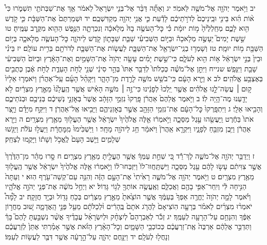 \documentclass[twoside, openany, parskip=half, 11pt]{book}
\begin{document}
יב וַיֹּ֥אמֶר יְהֹוָ֖ה אֶל־מֹשֶׁ֥ה לֵּאמֹֽר׃ יג וְאַתָּ֞ה דַּבֵּ֨ר אֶל־בְּנֵ֤י יִשְׂרָאֵל֙ לֵאמֹ֔ר אַ֥ךְ אֶת־שַׁבְּתֹתַ֖י תִּשְׁמֹ֑רוּ כִּי֩ א֨וֹת הִ֜וא בֵּינִ֤י וּבֵֽינֵיכֶם֙ לְדֹרֹ֣תֵיכֶ֔ם לָדַ֕עַת כִּ֛י אֲנִ֥י יְהֹוָ֖ה מְקַדִּשְׁכֶֽם׃ יד וּשְׁמַרְתֶּם֙ אֶת־הַשַּׁבָּ֔ת כִּ֛י קֹ֥דֶשׁ הִ֖וא לָכֶ֑ם מְחַֽלְלֶ֙יהָ֙ מ֣וֹת יוּמָ֔ת כִּ֗י כׇּל־הָעֹשֶׂ֥ה בָהּ֙ מְלָאכָ֔ה וְנִכְרְתָ֛ה הַנֶּ֥פֶשׁ הַהִ֖וא מִקֶּ֥רֶב עַמֶּֽיהָ׃ טו שֵׁ֣שֶׁת יָמִים֮ יֵעָשֶׂ֣ה מְלָאכָה֒ וּבַיּ֣וֹם הַשְּׁבִיעִ֗י שַׁבַּ֧ת שַׁבָּת֛וֹן קֹ֖דֶשׁ לַיהֹוָ֑ה כׇּל־הָעֹשֶׂ֧ה מְלָאכָ֛ה בְּי֥וֹם הַשַּׁבָּ֖ת מ֥וֹת יוּמָֽת׃ טז וְשָׁמְר֥וּ בְנֵֽי־יִשְׂרָאֵ֖ל אֶת־הַשַּׁבָּ֑ת לַעֲשׂ֧וֹת אֶת־הַשַּׁבָּ֛ת לְדֹרֹתָ֖ם בְּרִ֥ית עוֹלָֽם׃ יז בֵּינִ֗י וּבֵין֙ בְּנֵ֣י יִשְׂרָאֵ֔ל א֥וֹת הִ֖וא לְעֹלָ֑ם כִּי־שֵׁ֣שֶׁת יָמִ֗ים עָשָׂ֤ה יְהֹוָה֙ אֶת־הַשָּׁמַ֣יִם וְאֶת־הָאָ֔רֶץ וּבַיּוֹם֙ הַשְּׁבִיעִ֔י שָׁבַ֖ת וַיִּנָּפַֽשׁ׃
שנייח וַיִּתֵּ֣ן אֶל־מֹשֶׁ֗ה כְּכַלֹּתוֹ֙ לְדַבֵּ֤ר אִתּוֹ֙ בְּהַ֣ר סִינַ֔י שְׁנֵ֖י לֻחֹ֣ת הָעֵדֻ֑ת לֻחֹ֣ת אֶ֔בֶן כְּתֻבִ֖ים בְּאֶצְבַּ֥ע אֱלֹהִֽים׃ לב א וַיַּ֣רְא הָעָ֔ם כִּֽי־בֹשֵׁ֥שׁ מֹשֶׁ֖ה לָרֶ֣דֶת מִן־הָהָ֑ר וַיִּקָּהֵ֨ל הָעָ֜ם עַֽל־אַהֲרֹ֗ן וַיֹּאמְר֤וּ אֵלָיו֙ ק֣וּם ׀ עֲשֵׂה־לָ֣נוּ אֱלֹהִ֗ים אֲשֶׁ֤ר יֵֽלְכוּ֙ לְפָנֵ֔ינוּ כִּי־זֶ֣ה ׀ מֹשֶׁ֣ה הָאִ֗ישׁ אֲשֶׁ֤ר הֶֽעֱלָ֙נוּ֙ מֵאֶ֣רֶץ מִצְרַ֔יִם לֹ֥א יָדַ֖עְנוּ מֶה־הָ֥יָה לֽוֹ׃ ב וַיֹּ֤אמֶר אֲלֵהֶם֙ אַהֲרֹ֔ן פָּֽרְקוּ֙ נִזְמֵ֣י הַזָּהָ֔ב אֲשֶׁר֙ בְּאׇזְנֵ֣י נְשֵׁיכֶ֔ם בְּנֵיכֶ֖ם וּבְנֹתֵיכֶ֑ם וְהָבִ֖יאוּ אֵלָֽי׃ ג וַיִּתְפָּֽרְקוּ֙ כׇּל־הָעָ֔ם אֶת־נִזְמֵ֥י הַזָּהָ֖ב אֲשֶׁ֣ר בְּאׇזְנֵיהֶ֑ם וַיָּבִ֖יאוּ אֶֽל־אַהֲרֹֽן׃ ד וַיִּקַּ֣ח מִיָּדָ֗ם וַיָּ֤צַר אֹתוֹ֙ בַּחֶ֔רֶט וַֽיַּעֲשֵׂ֖הוּ עֵ֣גֶל מַסֵּכָ֑ה וַיֹּ֣אמְר֔וּ אֵ֤לֶּה אֱלֹהֶ֙יךָ֙ יִשְׂרָאֵ֔ל אֲשֶׁ֥ר הֶעֱל֖וּךָ מֵאֶ֥רֶץ מִצְרָֽיִם׃ ה וַיַּ֣רְא אַהֲרֹ֔ן וַיִּ֥בֶן מִזְבֵּ֖חַ לְפָנָ֑יו וַיִּקְרָ֤א אַֽהֲרֹן֙ וַיֹּאמַ֔ר חַ֥ג לַיהֹוָ֖ה מָחָֽר׃ ו וַיַּשְׁכִּ֙ימוּ֙ מִֽמׇּחֳרָ֔ת וַיַּעֲל֣וּ עֹלֹ֔ת וַיַּגִּ֖שׁוּ שְׁלָמִ֑ים וַיֵּ֤שֶׁב הָעָם֙ לֶֽאֱכֹ֣ל וְשָׁת֔וֹ וַיָּקֻ֖מוּ לְצַחֵֽק׃

ז וַיְדַבֵּ֥ר יְהֹוָ֖ה אֶל־מֹשֶׁ֑ה לֶךְ־רֵ֕ד כִּ֚י שִׁחֵ֣ת עַמְּךָ֔ אֲשֶׁ֥ר הֶעֱלֵ֖יתָ מֵאֶ֥רֶץ מִצְרָֽיִם׃ ח סָ֣רוּ מַהֵ֗ר מִן־הַדֶּ֙רֶךְ֙ אֲשֶׁ֣ר צִוִּיתִ֔ם עָשׂ֣וּ לָהֶ֔ם עֵ֖גֶל מַסֵּכָ֑ה וַיִּשְׁתַּֽחֲווּ־לוֹ֙ וַיִּזְבְּחוּ־ל֔וֹ וַיֹּ֣אמְר֔וּ אֵ֤לֶּה אֱלֹהֶ֙יךָ֙ יִשְׂרָאֵ֔ל אֲשֶׁ֥ר הֶֽעֱל֖וּךָ מֵאֶ֥רֶץ מִצְרָֽיִם׃ ט וַיֹּ֥אמֶר יְהֹוָ֖ה אֶל־מֹשֶׁ֑ה רָאִ֙יתִי֙ אֶת־הָעָ֣ם הַזֶּ֔ה וְהִנֵּ֥ה עַם־קְשֵׁה־עֹ֖רֶף הֽוּא׃ י וְעַתָּה֙ הַנִּ֣יחָה לִּ֔י וְיִֽחַר־אַפִּ֥י בָהֶ֖ם וַאֲכַלֵּ֑ם וְאֶֽעֱשֶׂ֥ה אוֹתְךָ֖ לְג֥וֹי גָּדֽוֹל׃ יא וַיְחַ֣ל מֹשֶׁ֔ה אֶת־פְּנֵ֖י יְהֹוָ֣ה אֱלֹהָ֑יו וַיֹּ֗אמֶר לָמָ֤ה יְהֹוָה֙ יֶחֱרֶ֤ה אַפְּךָ֙ בְּעַמֶּ֔ךָ אֲשֶׁ֤ר הוֹצֵ֙אתָ֙ מֵאֶ֣רֶץ מִצְרַ֔יִם בְּכֹ֥חַ גָּד֖וֹל וּבְיָ֥ד חֲזָקָֽה׃ יב לָ֩מָּה֩ יֹאמְר֨וּ מִצְרַ֜יִם לֵאמֹ֗ר בְּרָעָ֤ה הֽוֹצִיאָם֙ לַהֲרֹ֤ג אֹתָם֙ בֶּֽהָרִ֔ים וּ֨לְכַלֹּתָ֔ם מֵעַ֖ל פְּנֵ֣י הָֽאֲדָמָ֑ה שׁ֚וּב מֵחֲר֣וֹן אַפֶּ֔ךָ וְהִנָּחֵ֥ם עַל־הָרָעָ֖ה לְעַמֶּֽךָ׃ יג זְכֹ֡ר לְאַבְרָהָם֩ לְיִצְחָ֨ק וּלְיִשְׂרָאֵ֜ל עֲבָדֶ֗יךָ אֲשֶׁ֨ר נִשְׁבַּ֣עְתָּ לָהֶם֮ בָּךְ֒ וַתְּדַבֵּ֣ר אֲלֵהֶ֔ם אַרְבֶּה֙ אֶֽת־זַרְעֲכֶ֔ם כְּכוֹכְבֵ֖י הַשָּׁמָ֑יִם וְכׇל־הָאָ֨רֶץ הַזֹּ֜את אֲשֶׁ֣ר אָמַ֗רְתִּי אֶתֵּן֙ לְזַרְעֲכֶ֔ם וְנָחֲל֖וּ לְעֹלָֽם׃ יד וַיִּנָּ֖חֶם יְהֹוָ֑ה עַל־הָ֣רָעָ֔ה אֲשֶׁ֥ר דִּבֶּ֖ר לַעֲשׂ֥וֹת לְעַמּֽוֹ׃
\end{document}
